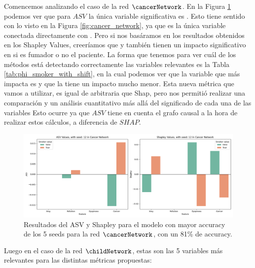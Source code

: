 Comencemos analizando el caso de la red $\cancerNetwork$. En la Figura \ref{fig:shapleyVsASVSingleSeedCancer} podemos ver que para $ASV$ la única variable significativa es . Esto tiene sentido con lo visto en la Figura \ref{fig:cancer_network}, ya que es la única variable conectada directamente con . Pero si nos basáramos en los resultados obtenidos en los Shapley Values, creeríamos que  y  también tienen un impacto significativo en si es fumador o no el paciente. La forma que tenemos para ver cuál de los métodos está detectando correctamente las variables relevantes es la Tabla \ref{tab:phi_smoker_with_shift}, en la cual podemos ver que la variable que más impacta es  y que la  tiene un impacto mucho menor. Esta nueva métrica que vamos a utilizar, es igual de arbitraria que Shap, pero nos permitió realizar una comparación y un análisis cuantitativo más allá del significado de cada una de las variables 
Esto ocurre ya que $ASV$ tiene en cuenta el grafo causal a la hora de realizar estos cálculos, a diferencia de $SHAP$. 

\begin{figure}
    \centering
    \includegraphics[width=1\linewidth]{img/asvResults/cancerASVAndShapleyExactASVAndShapley.png}
    \caption{Resultados del ASV y Shapley para el modelo con mayor accuracy de los 5 seeds para la red $\cancerNetwork$, con un 81\% de accuracy. }
    \label{fig:shapleyVsASVSingleSeedCancer}
\end{figure}

Luego en el caso de la red $\childNetwork$, estas son las 5 variables más relevantes para las distintas métricas propuestas:

